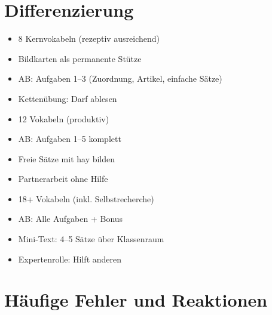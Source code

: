 \documentclass[11pt,a4paper]{article}
\begin{document}
\section*{Differenzierung}

\begin{tcolorbox}[colback=white, colframe=basis, title=\textcolor{white}{\textbf{[B] Basis}}]
\begin{itemize}[nosep]
    \item 8 Kernvokabeln (rezeptiv ausreichend)
    \item Bildkarten als permanente Stütze
    \item AB: Aufgaben 1--3 (Zuordnung, Artikel, einfache Sätze)
    \item Kettenübung: Darf ablesen
\end{itemize}
\end{tcolorbox}

\begin{tcolorbox}[colback=white, colframe=standard, title=\textcolor{white}{\textbf{[S] Standard}}]
\begin{itemize}[nosep]
    \item 12 Vokabeln (produktiv)
    \item AB: Aufgaben 1--5 komplett
    \item Freie Sätze mit hay bilden
    \item Partnerarbeit ohne Hilfe
\end{itemize}
\end{tcolorbox}

\begin{tcolorbox}[colback=white, colframe=erweiterung, title=\textcolor{white}{\textbf{[E] Erweiterung}}]
\begin{itemize}[nosep]
    \item 18+ Vokabeln (inkl. Selbstrecherche)
    \item AB: Alle Aufgaben + Bonus
    \item Mini-Text: 4--5 Sätze über Klassenraum
    \item Expertenrolle: Hilft anderen
\end{itemize}
\end{tcolorbox}

\vspace{0.5cm}

\section*{Häufige Fehler und Reaktionen}
\end{document}
